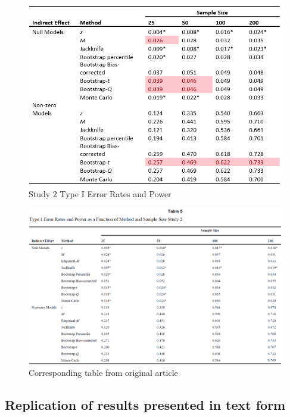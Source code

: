 \documentclass[10,a4paperpaper,]{article}
\begin{document}
\newpage
\begin{landscape}

\begin{figure}
\centering
\includegraphics[width=1\textwidth,height=\textheight]{RepliSimsTable5.PNG}
\caption{Study 2 Type I Error Rates and Power}
\end{figure}

\begin{figure}
\includegraphics[width=1\linewidth]{RepliSimsMacKinnonTable5} \caption{Corresponding table from original article}\label{fig:unnamed-chunk-9}
\end{figure}

\end{landscape}

\newpage

\subsection{Replication of results presented in text form }
\end{document}
